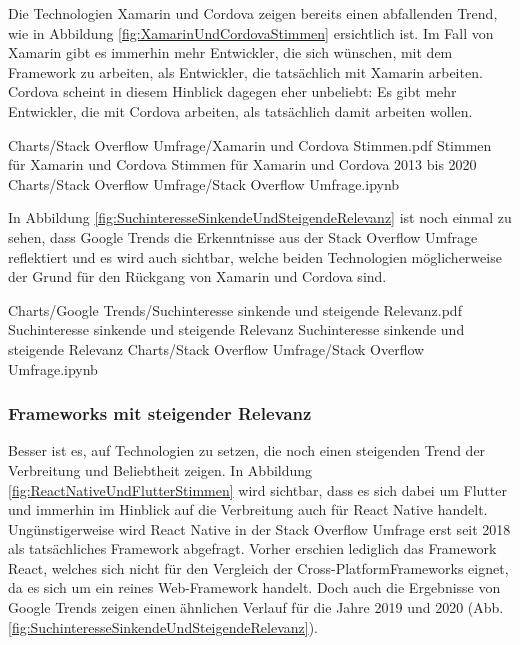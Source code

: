 Die Technologien Xamarin und Cordova zeigen bereits einen abfallenden Trend, wie in Abbildung \ref{fig:XamarinUndCordovaStimmen} ersichtlich ist. Im Fall von Xamarin gibt es immerhin mehr Entwickler, die sich wünschen, mit dem Framework zu arbeiten, als Entwickler, die tatsächlich mit Xamarin arbeiten. Cordova scheint in diesem Hinblick dagegen eher unbeliebt: Es gibt mehr Entwickler, die mit Cordova arbeiten, als tatsächlich damit arbeiten wollen.

\begin{alexfigurewithnotebook}{Charts/Stack Overflow Umfrage/Xamarin und Cordova Stimmen.pdf}
	{Stimmen für Xamarin und Cordova}
	{Stimmen für Xamarin und Cordova 2013 bis 2020}
	{Charts/Stack Overflow Umfrage/Stack Overflow Umfrage.ipynb}
	{}
	\label{fig:XamarinUndCordovaStimmen}

\end{alexfigurewithnotebook}


In Abbildung \ref{fig:SuchinteresseSinkendeUndSteigendeRelevanz} ist noch einmal zu sehen, dass Google Trends die Erkenntnisse aus der Stack Overflow Umfrage reflektiert und es wird auch sichtbar, welche beiden Technologien möglicherweise der Grund für den Rückgang von Xamarin und Cordova sind.

\begin{alexfigurewithnotebook}{Charts/Google Trends/Suchinteresse sinkende und steigende Relevanz.pdf}
	{Suchinteresse sinkende und steigende Relevanz}
	{Suchinteresse sinkende und steigende Relevanz}
	{Charts/Stack Overflow Umfrage/Stack Overflow Umfrage.ipynb}
	{}
	\label{fig:SuchinteresseSinkendeUndSteigendeRelevanz}

\end{alexfigurewithnotebook}

\subsubsection{Frameworks mit steigender Relevanz}

Besser ist es, auf Technologien zu setzen, die noch einen steigenden Trend der Verbreitung und Beliebtheit zeigen. In Abbildung \ref{fig:ReactNativeUndFlutterStimmen} wird sichtbar, dass es sich dabei um Flutter und immerhin im Hinblick auf die Verbreitung auch für React Native handelt. Ungünstigerweise wird React Native in der Stack Overflow Umfrage erst seit 2018 als tatsächliches Framework abgefragt. Vorher erschien lediglich das Framework React, welches sich nicht für den Vergleich der Cross-PlatformFrameworks eignet, da es sich um ein reines Web-Framework handelt. Doch auch die Ergebnisse von Google Trends zeigen einen ähnlichen Verlauf für die Jahre 2019 und 2020 (Abb. \ref{fig:SuchinteresseSinkendeUndSteigendeRelevanz}).

